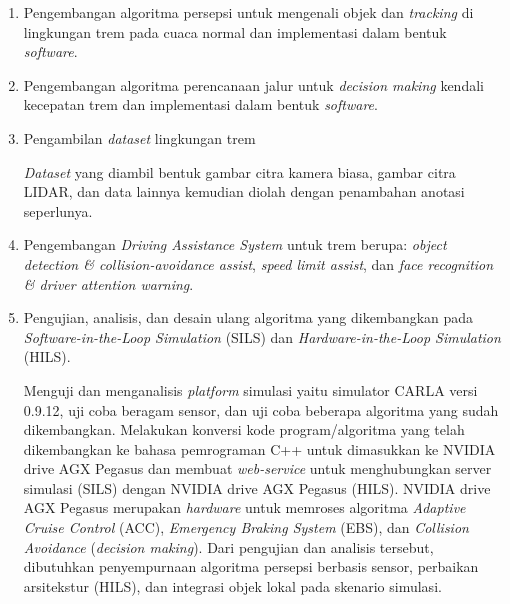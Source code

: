 \begin{enumerate}

    \item Pengembangan algoritma persepsi untuk mengenali objek dan
    \textit{tracking} di lingkungan trem pada cuaca normal dan implementasi
    dalam bentuk \textit{software}.


    \item Pengembangan algoritma perencanaan jalur untuk \textit{decision
    making} kendali kecepatan trem dan implementasi dalam bentuk
    \textit{software}.


    \item Pengambilan \textit{dataset} lingkungan trem

    \textit{Dataset} yang diambil bentuk gambar citra kamera biasa, gambar citra
    LIDAR, dan data lainnya kemudian diolah dengan penambahan anotasi
    seperlunya.

    \item Pengembangan \textit{Driving Assistance System} untuk trem berupa:
    \textit{object detection \& collision-avoidance assist}, \textit{speed limit
    assist}, dan \textit{face recognition \& driver attention warning}.

    \item Pengujian, analisis, dan desain ulang algoritma yang dikembangkan pada
    \textit{Software-in-the-Loop Simulation} (SILS) dan
    \textit{Hardware-in-the-Loop Simulation} (HILS).

    Menguji dan menganalisis \textit{platform} simulasi yaitu simulator CARLA
    versi 0.9.12, uji coba beragam sensor, dan uji coba beberapa algoritma yang
    sudah dikembangkan. Melakukan konversi kode program/algoritma yang telah
    dikembangkan ke bahasa pemrograman C++ untuk dimasukkan ke NVIDIA drive AGX
    Pegasus dan membuat \textit{web-service} untuk menghubungkan server simulasi
    (SILS) dengan NVIDIA drive AGX Pegasus (HILS). NVIDIA drive AGX Pegasus
    merupakan \textit{hardware} untuk memroses algoritma \textit{Adaptive Cruise
    Control} (ACC), \textit{Emergency Braking System} (EBS), dan
    \textit{Collision Avoidance} (\textit{decision making}). Dari pengujian dan
    analisis tersebut, dibutuhkan penyempurnaan algoritma persepsi berbasis
    sensor, perbaikan arsitekstur (HILS), dan integrasi objek lokal pada
    skenario simulasi.


\end{enumerate}
